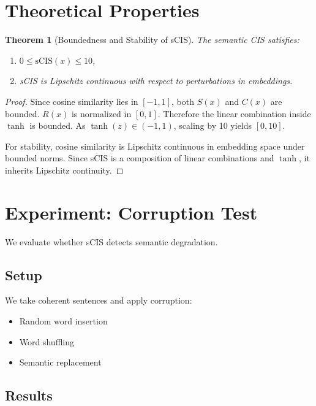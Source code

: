 \documentclass{article}
\newtheorem{theorem}{Theorem}
\theoremstyle{definition}
\newtheorem{proof}{Proof}
\begin{document}
\section{Theoretical Properties}

\begin{theorem}[Boundedness and Stability of sCIS]
The semantic CIS satisfies:
\begin{enumerate}
    \item $0 \leq \text{sCIS}(x) \leq 10$,
    \item sCIS is Lipschitz continuous with respect to perturbations in embeddings.
\end{enumerate}
\end{theorem}

\begin{proof}
Since cosine similarity lies in $[-1,1]$, both $S(x)$ and $C(x)$ are bounded. $R(x)$ is normalized in $[0,1]$. Therefore the linear combination inside $\tanh$ is bounded. As $\tanh(z) \in (-1,1)$, scaling by 10 yields $[0,10]$.

For stability, cosine similarity is Lipschitz continuous in embedding space under bounded norms. Since sCIS is a composition of linear combinations and $\tanh$, it inherits Lipschitz continuity.
\end{proof}

\section{Experiment: Corruption Test}

We evaluate whether sCIS detects semantic degradation.

\subsection{Setup}
We take coherent sentences and apply corruption:
\begin{itemize}[noitemsep]
    \item Random word insertion
    \item Word shuffling
    \item Semantic replacement
\end{itemize}

\subsection{Results}
\end{document}
